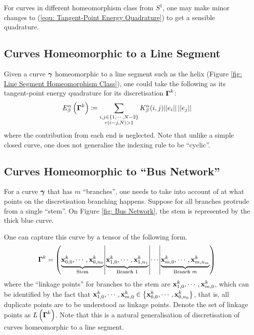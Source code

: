 \documentclass[../dissertation.tex]{subfiles}
\begin{document}
For curves in different homeomorphism class from $S^1$,
one may make minor changes to (\ref{equ: Tangent-Point Energy Quadrature}) to get a sensible quadrature.

\subsection{Curves Homeomorphic to a Line Segment}
Given a curve $\boldsymbol{\gamma}$ homeomorphic to a line segment such as the helix (Figure \ref{fig: Line Segment Homeomorphism Class}),
one could take the following as its tangent-point energy quadrature for its discretisation $\boldsymbol{\Gamma}^k$:
\begin{equation}
    E_{\beta}^{\alpha} \left( \boldsymbol{\Gamma}^k \right) \coloneqq \sum_{\substack{i,j \in \left\{ 1, \cdots, N-2 \right\} \\ r\left( i-j,N \right) > 1}} K_{\beta}^{\alpha} (i,j) \lvert \lvert e_i \rvert \rvert \, \lvert \lvert e_j \rvert \rvert
\end{equation}
where the contribution from each end is neglected.
Note that unlike a simple closed curve,
one does not generalise the indexing rule to be ``cyclic''.

\subsection{Curves Homeomorphic to ``Bus Network''}
For a curve $\boldsymbol{\gamma}$ that has $m$ ``branches'', one needs to take into account of at what points on the discretisation branching happens.
Suppose for all branches protrude from a single ``stem''.
On Figure \ref{fig: Bus Network}, the stem is represented by the thick blue curve.

One can capture this curve by a tensor of the following form.
\begin{equation*}
    \boldsymbol{\Gamma}^k = \left( \underbrace{\mathbf{x}_{0,0}^k, \cdots, \mathbf{x}_{0,n_0}^k}_{\text{Stem}} \middle|
    \underbrace{\mathbf{x}_{1,0}^k, \cdots, \mathbf{x}_{1,n_1}^k}_{\text{Branch 1}}
\middle| \cdots \middle|
\underbrace{\mathbf{x}_{m,0}^k, \cdots, \mathbf{x}_{m,n_m}^k}_{\text{Branch } m}\right)
\end{equation*}
where the ``linkage points'' for branches to the stem are $\mathbf{x}_{1,0}^k, \cdots, \mathbf{x}_{m,0}^k$,
which can be identified by the fact that $\mathbf{x}_{1,0}^k, \cdots, \mathbf{x}_{m,0}^k \in \left\{ \mathbf{x}_{0,0}^k, \cdots, \mathbf{x}_{0, n_0}^k \right\}$,
that is, all duplicate points are to be understood as linkage points.
Denote the set of linkage points as $L \left( \boldsymbol{\Gamma}^k \right)$.
Note that this is a natural generalisation of discretisation of curves homeomorphic to a line segment.
\end{document}
